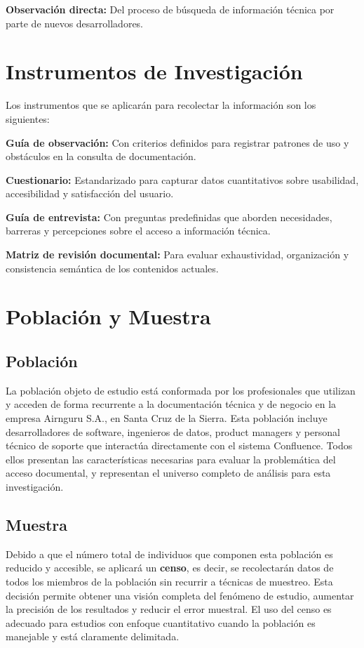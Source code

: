 \textbf{Observación directa:} Del proceso de búsqueda de información técnica por parte de nuevos desarrolladores.

\section{Instrumentos de Investigación}

Los instrumentos que se aplicarán para recolectar la información son los siguientes:

\textbf{Guía de observación:} Con criterios definidos para registrar patrones de uso y obstáculos en la consulta de documentación.

\textbf{Cuestionario:} Estandarizado para capturar datos cuantitativos sobre usabilidad, accesibilidad y satisfacción del usuario.

\textbf{Guía de entrevista:} Con preguntas predefinidas que aborden necesidades, barreras y percepciones sobre el acceso a información técnica.

\textbf{Matriz de revisión documental:} Para evaluar exhaustividad, organización y consistencia semántica de los contenidos actuales.


\section{Población y Muestra}

\subsection{Población}

La población objeto de estudio está conformada por los profesionales que utilizan y acceden de forma recurrente a la documentación técnica y de negocio en la empresa Airnguru S.A., en Santa Cruz de la Sierra. Esta población incluye desarrolladores de software, ingenieros de datos, product managers y personal técnico de soporte que interactúa directamente con el sistema Confluence. Todos ellos presentan las características necesarias para evaluar la problemática del acceso documental, y representan el universo completo de análisis para esta investigación.

\subsection{Muestra}

Debido a que el número total de individuos que componen esta población es reducido y accesible, se aplicará un \textbf{censo}, es decir, se recolectarán datos de todos los miembros de la población sin recurrir a técnicas de muestreo. Esta decisión permite obtener una visión completa del fenómeno de estudio, aumentar la precisión de los resultados y reducir el error muestral. El uso del censo es adecuado para estudios con enfoque cuantitativo cuando la población es manejable y está claramente delimitada.


